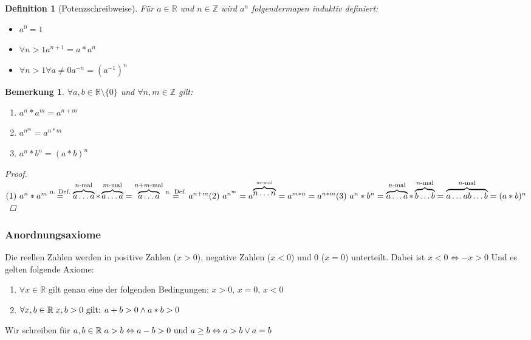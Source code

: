 \documentclass[a4paper,titlepage,oneside]{article}
\def\Z{\ensuremath{\mathbb{Z}} }
\def\R{\ensuremath{\mathbb{R}} }
\newcommand{\fa}[1]{\ensuremath{\forall#1}}
\newcommand{\fain}[2]{\ensuremath{\forall#1\in#2}}
\def\sp{\hspace{0,1cm}}
\theoremstyle{thmstyle}
\newtheorem{defi}[satz]{Definition}
\newtheorem{bem}[satz]{Bemerkung}
\begin{document}
\begin{defi}[Potenzschreibweise]
Für $a \in \R $ und $n \in \Z$ wird $a^n$ folgendermapen induktiv definiert:
\begin{itemize}
\item $a^0 = 1$ 
\item $\fa{n > 1} a^{n+1} = a * a^n $
\item $ \fa{n > 1} \fa{a \ne 0} a^{-n} = \left(a^{-1}\right)^n$
\end{itemize}
\end{defi}
\newpage
\begin{bem}
\fain{ a, b}{\R \setminus \{0\}} und \fain{n, m}{\Z} gilt:
\begin{enumerate}[label=(\arabic*)]
\item \(a^n * a^m = a^{n+m} \)
\item \(a^{n^m} = a^{n * m} \)
\item \(a^n * b^n = (a * b)^n \)
\end{enumerate}
\begin{proof}
\begin{math}\\
\text{(1) } a^n * a^m \overset{\text{n. Def.}}{=} \overbrace{a \dots a}^{n\text{-mal}}*\overbrace{a \dots a}^{m\text{-mal}} = \overbrace{a \dots a}^{n+m\text{-mal}} \overset{\text{n. Def.}}{=} a^{n+m}\\
\text{(2) }  a^{n^m} = a^{\overbrace{n \dots n}^{m\text{-mal}}} = a^{m * n} = a^{n*m}\\
\text{(3) }  a^n * b^n = \overbrace{a \dots a}^{n\text{-mal}}*\overbrace{b \dots b}^{n\text{-mal}} = \overbrace{a \dots a b \dots b}^{n\text{-mal}} = (a*b)^{n}\\
\end{math}
\end{proof}
\end{bem}

\subsubsection{Anordnungsaxiome}
Die reellen Zahlen werden in positive Zahlen ($x > 0$), negative Zahlen ($x < 0$) und 0 ($x = 0$) unterteilt. Dabei ist $x < 0 \Leftrightarrow -x > 0$
Und es gelten folgende Axiome:
\begin{enumerate}[label=(\arabic*)]
\item \(\fa x \in \R \) gilt genau eine der folgenden Bedingungen: \(x > 0\text{, } x = 0\text{, } x < 0 \)
\item \(\fa x,b \in \R \sp x,b > 0 \text{ gilt: } a + b > 0 \land a * b > 0\)
\end{enumerate}
Wir schreiben für $a, b \in \R \sp a > b \Leftrightarrow a - b > 0\text{ und }a \ge b \Leftrightarrow a > b \lor a = b $
\end{document}
